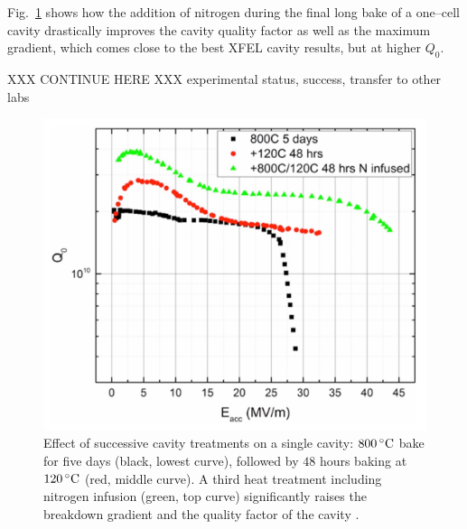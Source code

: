 Fig.~\ref{fig:n2infusion} \cite[Fig. 5]{Grassellino:2017bod} shows how the addition of nitrogen during the final  long  bake of a one--cell cavity drastically improves the cavity quality factor as well as the maximum gradient, which comes close to the best XFEL cavity results, but at higher $Q_0$.



XXX CONTINUE HERE XXX experimental status, success, transfer to other labs




\begin{figure}[htbp]
   \includegraphics[width=\hsize]{chapters/figures/sst-30-094004-fig5}
\caption{Effect of successive cavity treatments on a single cavity: $800\,{\mathrm{^\circ C}}$ bake for five days (black, lowest curve), followed by $48$ hours baking at $120\,{\mathrm{^\circ C}}$ (red, middle curve). 
A third heat treatment including nitrogen infusion (green, top curve) significantly  raises the breakdown gradient and the quality factor of the cavity
\cite[Fig. 5]{Grassellino:2017bod}.
}
\label{fig:n2infusion}
\end{figure}

